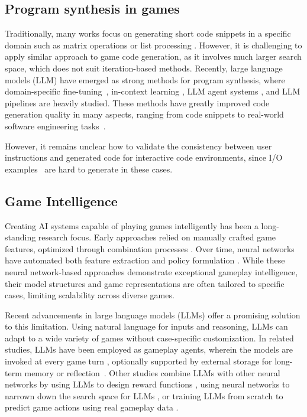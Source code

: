 \subsection{Program synthesis in games}

Traditionally, many works focus on generating short code snippets in a specific domain such as matrix operations \cite{tfcoder} or list processing \cite{ellis_dreamcoder_2021}
. However, it is challenging to apply similar approach to game code generation, as it involves much larger search space, which does not suit iteration-based methods. 
Recently, large language models (LLM) have emerged as strong methods for program synthesis, where domain-specific fine-tuning~\cite{wu2024instructiondriven}, in-context learning 
\cite{Gao2023},
LLM agent systems
\cite{chatdev}
, and LLM pipelines \cite{agentless} are heavily studied. These methods have greatly improved code generation quality in many aspects, ranging from code snippets to real-world software engineering tasks~\cite{jimenez2024swebench}. 

However, it remains unclear how to validate the consistency between user instructions and generated code for interactive code environments, since I/O examples~\cite{liu2023is} are hard to generate in these cases.

\subsection{Game Intelligence}

Creating AI systems capable of playing games intelligently has been a long-standing research focus. Early approaches relied on manually crafted game features, optimized through combination processes \cite{sturtevant_feature_2007}. Over time, neural networks have automated both feature extraction and policy formulation \cite{schmid_student_2023,zha_douzero_2021,brown_superhuman_2019}. While these neural network-based approaches demonstrate exceptional gameplay intelligence, their model structures and game representations are often tailored to specific cases, limiting scalability across diverse games.


Recent advancements in large language models (LLMs) offer a promising solution to this limitation. Using natural language for inputs and reasoning, LLMs can adapt to a wide variety of games without case-specific customization. In related studies, LLMs have been employed as gameplay agents, wherein the models are invoked at every game turn \cite{yao_react_2023}, optionally supported by external storage for long-term memory or reflection~\cite{guo_suspicion-agent_2023,shinn_reflexion_2023,zhang2024agentpro}. 
Other studies combine LLMs with other neural networks by using LLMs to design reward functions \cite{ma_eureka_2023,baek2024chatpcg}, using neural networks to narrown down the search space for LLMs \cite{Yim2024guandan}, or training LLMs from scratch to predict game actions using real gameplay data \cite{schultz2024masteringboard}. 

